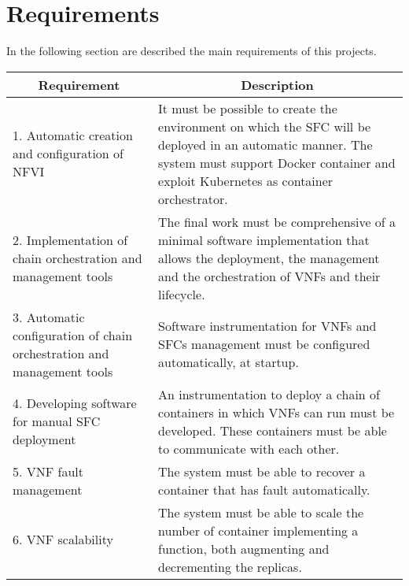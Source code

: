 \section{Requirements}\label{chap:prjan:sec:req}
In the following section are described the main requirements of this projects.

\begin{longtable}[c]{p{}p{}}
\hline
\multicolumn{1}{c}{\textbf{Requirement}}                                & \multicolumn{1}{c}{\textbf{Description}}                                                                                                                                                       \\ \hline
\endhead
%
\hline
\endfoot
%
\endlastfoot
%
1. Automatic creation and configuration of NFVI                         & It must be possible to create the environment on which the SFC will be deployed in an automatic manner. The system must support Docker container and exploit Kubernetes as container orchestrator. \\
2. Implementation of chain orchestration and management tools           & The final work must be comprehensive of a minimal software implementation that allows the deployment, the management and the orchestration of VNFs and their lifecycle.                      \\
3. Automatic configuration of chain orchestration and management tools & Software instrumentation for VNFs and SFCs management must be configured automatically, at startup.                                                                                              \\
4. Developing software for manual SFC deployment                        & An instrumentation to deploy a chain of containers in which VNFs can run must be developed. These containers must be able to communicate with each other.                                                \\
5. VNF fault management                                                 & The system must be able to recover a container that has fault automatically.                                                                                                                      \\
6. VNF scalability                                                      & The system must be able to scale the number of container implementing a function, both augmenting and decrementing the replicas.                                                               \\

\end{longtable}
